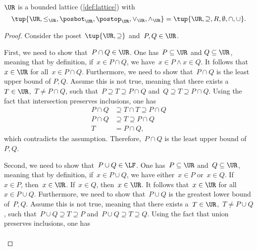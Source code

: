 
\begin{lemma}
  \label{lem:u_bounded_lat}
  $\UR$ is a bounded lattice (\cref{def:lattice}) with
  \begin{equation}
    \tup{\UR,\leq_{\UR},\posbot_{\UR},\postop_{\UR},\vee_{\UR},\wedge_{\UR}}=\tup{\UR,\supseteq,R,\emptyset,\cap,\cup}.
  \end{equation}
\end{lemma}
\begin{proof}
  Consider the poset~$\tup{\UR,\supseteq}$ and~$P,Q\in \UR$.
  \begin{compactitem}
    \item First, we need to show that~$P\cap Q\in \UR$. One has~$P \subseteq \UR$ and $Q\subseteq \UR$, meaning that by definition, if~$x\in P\cap Q$, we have~$x\in P \wedge x\in Q$. It follows that~$x\in \UR$ for all~$x\in P\cap Q$. Furthermore, we need to show that~$P\cap Q$ is the least upper bound of $P,Q$. Assume this is not true, meaning that  there exists a~$T\in \UR$,~$T\neq P\cap Q$, such that~$P\supseteq T\supseteq P\cap Q$ and~$Q\supseteq T\supseteq P\cap Q$. Using the fact that intersection preserves inclusions, one has
    \begin{equation}
      \begin{aligned}
        P\cap Q &\supseteq T\cap T \supseteq P\cap Q\\
        P\cap Q &\supseteq T \supseteq P\cap Q\\
        T&= P\cap Q,
      \end{aligned}
    \end{equation}
    which contradicts the assumption. Therefore,~$P\cap Q$ is the least upper bound of~$P,Q$.
    \item Second, we need to show that~$P\cup Q\in \LF$. One has~$P\subseteq \UR$ and~$Q\subseteq \UR$, meaning that by definition, if~$x\in P\cup Q$, we have either~$x\in P$ or~$x\in Q$. If~$x\in P$, then~$x\in \UR$. If~$x\in Q$, then~$x\in \UR$. It follows that~$x\in \UR$ for all~$x\in P\cup Q$. Furthermore, we need to show that~$P\cup Q$ is the greatest lower bound of~$P,Q$. Assume this is not true, meaning that  there exists a~$T\in \UR$,~$T\neq P\cup Q$, such that~$P\cup Q\supseteq T\supseteq P$ and~$P\cup Q\supseteq T\supseteq Q$. Using the fact that union preserves inclusions, one has
    \begin{equation}
      \begin{aligned}

\end{aligned}
\end{equation}
\end{compactitem}
\end{proof}
